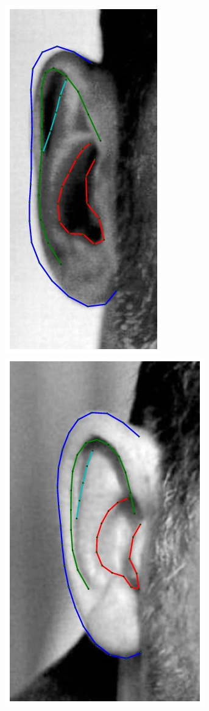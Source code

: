 \begin{figure}[!t]
    \includegraphics[height=\flowh]{resources/Ear_Deformable_Model/fittings/final_0004}
    \includegraphics[height=\flowh]{resources/Ear_Deformable_Model/fittings/final_0005}

\end{figure}

